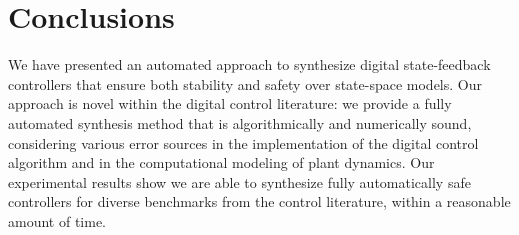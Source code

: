 
\section{Conclusions}
\label{sec:conclusions}

We have presented an automated approach to synthesize digital
state-feedback controllers that ensure both stability and safety over state-space models.   
%
Our approach is novel within the digital control literature: we provide a fully
automated synthesis method that is algorithmically and numerically sound,
considering various error sources in the implementation of the digital
control algorithm and in the computational modeling of plant dynamics.
%
Our experimental results show we are able to synthesize fully automatically 
safe controllers for diverse benchmarks from the control literature, 
within a reasonable amount of time.  


%





